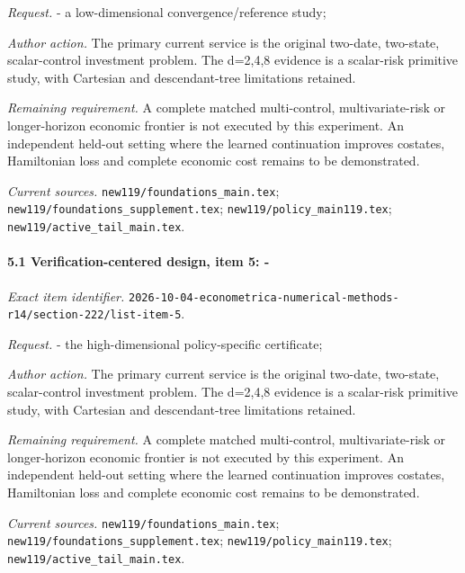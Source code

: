 \par\emph{Request.} - a low-dimensional convergence/\allowbreak{}reference study;

\par\emph{Author action.} The primary current service is the original two-date, two-state, scalar-control investment problem. The d=2,4,8 evidence is a scalar-risk primitive study, with Cartesian and descendant-tree limitations retained.

\par\emph{Remaining requirement.} A complete matched multi-control, multivariate-risk or longer-horizon economic frontier is not executed by this experiment. An independent held-out setting where the learned continuation improves costates, Hamiltonian loss and complete economic cost remains to be demonstrated.

\par\emph{Current sources.} \nolinkurl{new119/foundations_main.tex}; \nolinkurl{new119/foundations_supplement.tex}; \nolinkurl{new119/policy_main119.tex}; \nolinkurl{new119/active_tail_main.tex}.

\paragraph{5.1 Verification-centered design, item 5: -}

\emph{Exact item identifier.} \nolinkurl{2026-10-04-econometrica-numerical-methods-r14/section-222/list-item-5}.

\par\emph{Request.} - the high-dimensional policy-specific certificate;

\par\emph{Author action.} The primary current service is the original two-date, two-state, scalar-control investment problem. The d=2,4,8 evidence is a scalar-risk primitive study, with Cartesian and descendant-tree limitations retained.

\par\emph{Remaining requirement.} A complete matched multi-control, multivariate-risk or longer-horizon economic frontier is not executed by this experiment. An independent held-out setting where the learned continuation improves costates, Hamiltonian loss and complete economic cost remains to be demonstrated.

\par\emph{Current sources.} \nolinkurl{new119/foundations_main.tex}; \nolinkurl{new119/foundations_supplement.tex}; \nolinkurl{new119/policy_main119.tex}; \nolinkurl{new119/active_tail_main.tex}.

